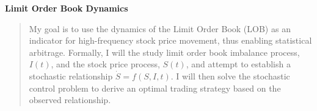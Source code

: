 \documentclass[12pt]{article}
\begin{document}
\mymascheader
\pagestyle{plain}
{\begin{center} {\large {\bf Limit Order Book Dynamics}} \end{center}}
\bigskip


\begin{quote}
My goal is to use the dynamics of the Limit Order Book (LOB) as an indicator for
high-frequency stock price movement, thus enabling statistical arbitrage. Formally, I will the study limit order book imbalance process, $I(t)$, and the stock price process, $S(t)$, and attempt to establish a stochastic relationship $\dot{S} = f(S,I,t)$. I will then solve the stochastic control problem to derive an optimal trading strategy based on the observed relationship.
\end{quote}
\end{document}
